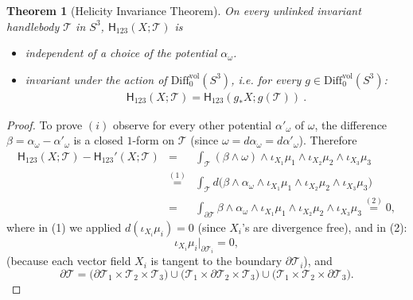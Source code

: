 \documentclass[12pt]{article}
\newtheorem{theorem}{Theorem}[section]
\begin{document}
\begin{theorem}[Helicity Invariance Theorem]\label{th:invariance-th}
 On every unlinked invariant handlebody $\mathcal{T}$ in $S^3$, $\mathsf{H}_{123}(X;\mathcal{T})$  is 
 \begin{itemize}
 \item[(i)] independent of a choice of the potential $\alpha_\omega$.
 \item[(ii)] invariant under the action of $\text{Diff}^\text{vol}_0(S^3)$, i.e. for every $g\in \text{Diff}^\text{vol}_0(S^3)$:
\begin{gather}\label{eq:invariance}
 \mathsf{H}_{123}(X;\mathcal{T})=\mathsf{H}_{123}(g_\ast X;g(\mathcal{T}))\ .
\end{gather}
 \end{itemize}
\end{theorem}
\begin{proof}
To prove $(i)$ observe for every other potential $\alpha'_\omega$ of $\omega$, the difference $\beta=\alpha_\omega-\alpha'_\omega$ is a closed $1$-form on $\mathcal{T}$
(since $\omega=d\alpha_\omega=d\alpha'_\omega$). Therefore
\begin{eqnarray*}
 \mathsf{H}_{123}(X;\mathcal{T})-\mathsf{H}_{123}'(X;\mathcal{T}) & = & \int_{\mathcal{T}} (\beta\wedge\omega)\wedge\iota_{X_1}\mu_1\wedge \iota_{X_2}\mu_2\wedge \iota_{X_3}\mu_3\\
 & \stackrel{(1)}{=} & \int_{\mathcal{T}} d\bigl(\beta\wedge \alpha_\omega\wedge\iota_{X_1}\mu_1\wedge \iota_{X_2}\mu_2\wedge \iota_{X_3}\mu_3\bigr)\\
 & = & \int_{\partial\mathcal{T}} \beta\wedge \alpha_\omega\wedge\iota_{X_1}\mu_1\wedge \iota_{X_2}\mu_2\wedge \iota_{X_3}\mu_3 \stackrel{(2)}{=} 0,
\end{eqnarray*}
where in (1) we applied $d(\iota_{X_i}\mu_i)=0$ (since $X_i$'s are divergence free), and 
in (2):
\[
 \iota_{X_i}\mu_i\bigl|_{\partial\mathcal{T}_i}=0,
\]
(because each vector field $X_i$ is tangent to the boundary $\partial \mathcal{T}_i$), and 
\[
 \partial \mathcal{T}=\bigl(\partial \mathcal{T}_1\times \mathcal{T}_2\times \mathcal{T}_3\bigr)\cup \bigl(\mathcal{T}_1\times \partial\mathcal{T}_2\times \mathcal{T}_3\bigr)\cup \bigl(\mathcal{T}_1\times \mathcal{T}_2\times \partial\mathcal{T}_3\bigr).
\]


\end{proof}
\end{document}
